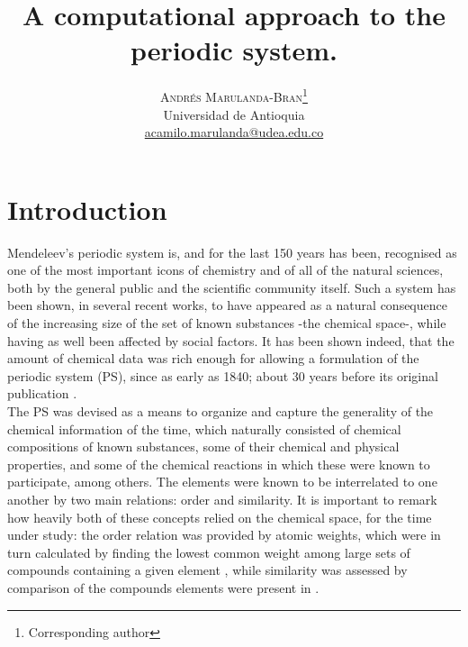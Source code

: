 \documentclass[article]{article}
\begin{document}
\theoremstyle{definition}
\newtheorem{definition}{Definition}[section]


\title{A computational approach to the periodic system.}

\author{%
\textsc{Andr\'es Marulanda-Bran}\thanks{Corresponding author} \\[1ex]
\normalsize Universidad de Antioquia \\ %
\normalsize \href{mailto:correoAndres}{acamilo.marulanda@udea.edu.co} %
}


\maketitle


\section{Introduction}
\label{sec:intro}

Mendeleev's periodic system is, and for the last 150 years has been, recognised as one of the most important icons of chemistry and of all of the natural sciences, both by the general public and the scientific community itself. Such a system has been shown, in several recent works, to have appeared as a natural consequence of the increasing size of the set of known substances -the chemical space-, while having as well been affected by social factors. It has been shown indeed, that the amount of chemical data was rich enough for allowing a formulation of the periodic system (PS), since as early as 1840; about 30 years before its original publication \cite{ChemSpacePSArose}.\\

The PS was devised as a means to organize and capture the generality of the chemical information of the time, which naturally consisted of chemical compositions of known substances, some of their chemical and physical properties, and some of the chemical reactions in which these were known to participate, among others. The elements were known to be interrelated to one another by two main relations: order and similarity. It is important to remark how heavily both of these concepts relied on the chemical space, for the time under study: the order relation was provided by atomic weights, which were in turn calculated by finding the lowest common weight among large sets of compounds containing a given element \cite{Hargittai:pf0063}, while similarity was assessed by comparison of the compounds elements were present in \cite{mendeleevSelectWritings}.\\
\end{document}
